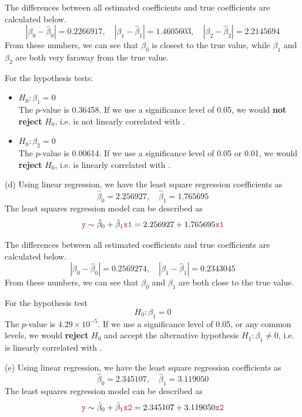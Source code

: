\documentclass[a4paper,12pt]{article}
\begin{document}
The differences between all estimated coefficients and true coefficients are calculated below.
\[
    |\beta_0 - \hat\beta_0| = 0.2266917,\quad 
    |\beta_1 - \hat\beta_1| = 1.4605603,\quad 
    |\beta_2 - \hat\beta_2| = 2.2145694
\]
From these numbers, we can see that $\beta_0$ is closest to the true value, while $\beta_1$ and $\beta_2$ are both very faraway from the true value.

For the hypothesis tests:
\begin{itemize}
    \item $H_0: \beta_1 = 0$\\
    The $p$-value is 0.36458. If we use a significance level of 0.05, we would \textbf{not reject} $H_0$, i.e. \yr is not linearly correlated with \xar. 
    
    \item $H_0: \beta_2 = 0$\\
    The $p$-value is 0.00614. If we use a significance level of 0.05 or 0.01, we would \textbf{reject} $H_0$, i.e. \yr is linearly correlated with \xbr.
\end{itemize}
\bigskip





(d)
Using linear regression, we have the least square regression coefficients as 
\[
    \hat\beta_0 = 2.256927 ,\quad 
    \hat\beta_1 = 1.765695 
\]
The least squares regression model can be described as 
\[
    \yr \sim\hat\beta_0 + \hat\beta_1\xar 
    = 2.256927 + 
    1.765695\xar 
\]

The differences between all estimated coefficients and true coefficients are calculated below.
\[
    |\beta_0 - \hat\beta_0| = 0.2569274,\quad 
    |\beta_1 - \hat\beta_1| = 0.2343045
\]
From these numbers, we can see that $\beta_0$ and $\beta_1$ are both close to the true value.
\bigskip

For the hypothesis test
\[
    H_0: \beta_1 = 0
\]
The $p$-value is $4.29\times 10^{-5}$. If we use a significance level of 0.05, or any common levels, we would \textbf{reject} $H_0$ and accept the alternative hypothesis $H_1: \beta_1 \ne 0$, i.e. \yr is linearly correlated with \xar. 
\bigskip
    
    

(e)
Using linear regression, we have the least square regression coefficients as 
\[
    \hat\beta_0 = 2.345107 ,\quad 
    \hat\beta_1 = 3.119050 
\]
The least squares regression model can be described as 
\[
    \yr \sim\hat\beta_0 + \hat\beta_1\xbr 
    = 2.345107 + 
    3.119050\xbr 
\]
\end{document}
